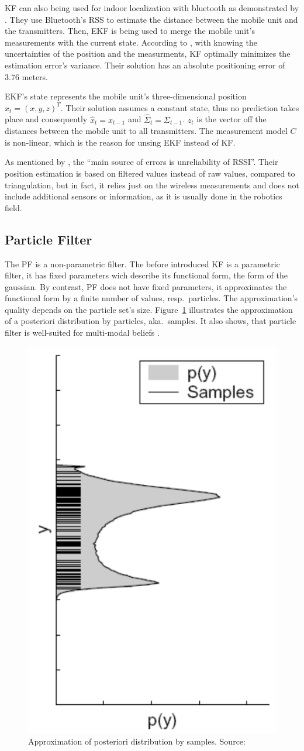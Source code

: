 \acs{KF} can also being used for indoor localization with bluetooth as demonstrated by \citet{kotanen:exp_local_pos_bt}. They use Bluetooth's \acs{RSS} to estimate the distance between the mobile unit and the transmitters. Then, \acl{EKF} is being used to merge the mobile unit's measurements with the current state. According to \cite{kotanen:exp_local_pos_bt}, with knowing the uncertainties of the position and the measurments, \acs{KF} optimally minimizes the estimation error's variance. Their solution has an absolute positioning error of 3.76 meters.

\acs{EKF}'s state represents the mobile unit's three-dimensional position $x_t = (x, y, z)^T$. Their solution assumes a constant state, thus no prediction takes place and consequently $\hat{x}_t = x_{t-1}$ and $\hat{\Sigma}_t = \Sigma_{t-1}$. $z_t$ is the vector off the distances between the mobile unit to all transmitters. The measurement model $C$ is non-linear, which is the reason for unsing \acs{EKF} instead of \acs{KF}.

As mentioned by \citet{kotanen:exp_local_pos_bt}, the ``main source of errors is unreliability of \acs{RSSI}''. Their position estimation is based on filtered values instead of raw values, compared to triangulation, but in fact, it relies just on the wireless measurements and does not include additional sensors or information, as it is usually done in the robotics field.

\subsection{Particle Filter}\label{sec:fund_pf}
The \ac{PF} is a non-parametric filter. The before introduced \acs{KF} is a parametric filter, it has fixed parameters wich describe its functional form, the form of the gaussian. By contrast, \acs{PF} does not have fixed parameters, it approximates the functional form by a finite number of values, resp.\ particles. The approximation's quality depends on the particle set's size. Figure~\ref{fig:pf_approx} illustrates the approximation of a posteriori distribution by particles, aka.\ samples. It also shows, that particle filter is well-suited for multi-modal beliefs \citep{thrun:prob_robo}.

\begin{figure}
	\includegraphics[height=0.45\textwidth]{figures/pf_approx}
	\caption{Approximation of posteriori distribution by samples. Source: \citep{thrun:prob_robo}}
	\label{fig:pf_approx}
\end{figure} 

